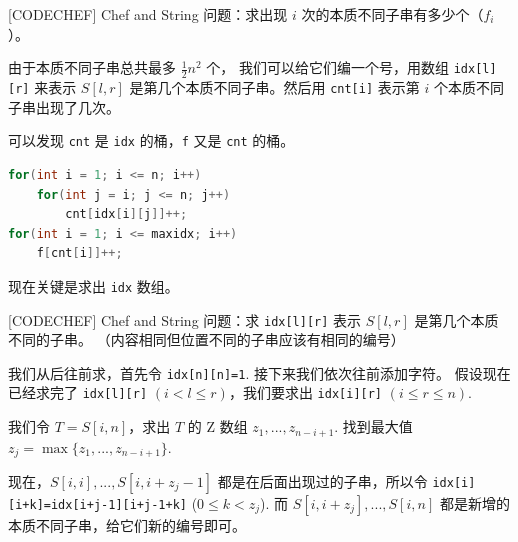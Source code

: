 \documentclass{beamer}
\begin{document}
\begin{frame}[fragile]{[CODECHEF] Chef and String}
    \small
    问题：求出现 $i$ 次的本质不同子串有多少个（$f_i$）。

    \vspace{1em}\pause
    由于本质不同子串总共最多 $\frac{1}{2}n^2$ 个，
    我们可以给它们编一个号，用数组 \verb|idx[l][r]| 来表示 $S[l,r]$
    是第几个本质不同子串。然后用 \verb|cnt[i]| 
    表示第 $i$ 个本质不同子串出现了几次。

    \vspace{1em}\pause
    可以发现 \verb|cnt| 是 \verb|idx| 的桶，\verb|f| 又是 \verb|cnt| 的桶。

    \begin{lstlisting}[language=c++]
for(int i = 1; i <= n; i++)
    for(int j = i; j <= n; j++)
        cnt[idx[i][j]]++;
for(int i = 1; i <= maxidx; i++)
    f[cnt[i]]++;
    \end{lstlisting}

    现在关键是求出 \verb|idx| 数组。
\end{frame}

\begin{frame}[fragile]{[CODECHEF] Chef and String}
    \small
    问题：求 \verb|idx[l][r]| 表示 $S[l,r]$ 是第几个本质不同的子串。
    （内容相同但位置不同的子串应该有相同的编号）

    \vspace{1em}\pause
    我们从后往前求，首先令 \verb|idx[n][n]=1|. 接下来我们依次往前添加字符。
    \pause 假设现在已经求完了 \verb|idx[l][r]| $(i<l\leq r)$，我们要求出 \verb|idx[i][r]| $(i\leq r\leq n)$.

    \vspace{1em}\pause
    我们令 $T=S[i,n]$，求出 $T$ 的 Z 数组 $z_1,...,z_{n-i+1}$. 找到最大值 $z_j=\max\{z_1,...,z_{n-i+1}\}$.

    \vspace{1em}\pause
    现在，$S[i,i],...,S[i,i+z_j-1]$ 都是在后面出现过的子串，所以令 \verb|idx[i][i+k]=idx[i+j-1][i+j-1+k]| ($0\leq k < z_j$).
    \vspace{.5em}
    而 $S[i,i+z_j],...,S[i,n]$ 都是新增的本质不同子串，给它们新的编号即可。
\end{frame}
\end{document}

